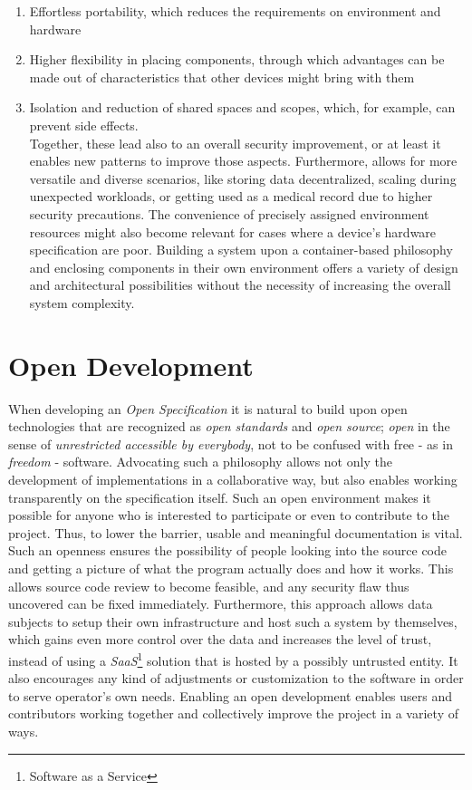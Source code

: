 \documentclass[12pt,english,a4paper,titlepage,cleardoublepage=empty,dottedtoc]{report}
\providecommand{\tightlist}{%
  \setlength{\itemsep}{0pt}\setlength{\parskip}{0pt}}
\begin{document}
\begin{enumerate}
\def\labelenumi{(\Alph{enumi})}
\tightlist
\item
  Effortless portability, which reduces the requirements on environment
  and hardware
\item
  Higher flexibility in placing components, through which advantages can
  be made out of characteristics that other devices might bring with
  them
\item
  Isolation and reduction of shared spaces and scopes, which, for
  example, can prevent side effects.\\
  Together, these lead also to an overall security improvement, or at
  least it enables new patterns to improve those aspects. Furthermore,
  allows for more versatile and diverse scenarios, like storing data
  decentralized, scaling during unexpected workloads, or getting used as
  a medical record due to higher security precautions. The convenience
  of precisely assigned environment resources might also become relevant
  for cases where a device's hardware specification are poor. Building a
  system upon a container-based philosophy and enclosing components in
  their own environment offers a variety of design and architectural
  possibilities without the necessity of increasing the overall system
  complexity.
\end{enumerate}

\section{Open Development}\label{open-development}

When developing an \emph{Open Specification} it is natural to build upon
open technologies that are recognized as \emph{open standards} and
\emph{open source}; \emph{open} in the sense of \emph{unrestricted
accessible by everybody}, not to be confused with free - as in
\emph{freedom} - software. Advocating such a philosophy allows not only
the development of implementations in a collaborative way, but also
enables working transparently on the specification itself. Such an open
environment makes it possible for anyone who is interested to
participate or even to contribute to the project. Thus, to lower the
barrier, usable and meaningful documentation is vital. Such an openness
ensures the possibility of people looking into the source code and
getting a picture of what the program actually does and how it works.
This allows source code review to become feasible, and any security flaw
thus uncovered can be fixed immediately. Furthermore, this approach
allows data subjects to setup their own infrastructure and host such a
system by themselves, which gains even more control over the data and
increases the level of trust, instead of using a \emph{SaaS}\footnote{Software
  as a Service} solution that is hosted by a possibly untrusted entity.
It also encourages any kind of adjustments or customization to the
software in order to serve operator's own needs. Enabling an open
development enables users and contributors working together and
collectively improve the project in a variety of ways.
\end{document}
